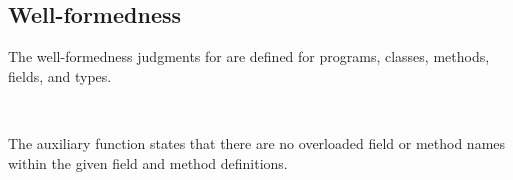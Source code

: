 \documentclass[acmlarge, anonymous, authordraft]{acmart}
\begin{document}
\begin{mathpar}


\end{mathpar}

\begin{mathpar}
\end{mathpar}

\subsection{Well-formedness}

The well-formedness judgments for \kafka are defined for programs, classes, methods, fields, and types.

~\\


\begin{mathpar}
\end{mathpar}


\begin{mathpar}
\end{mathpar}

The  auxiliary function states that there are no overloaded 
field or method names within the given field and method definitions. \\
\end{document}

